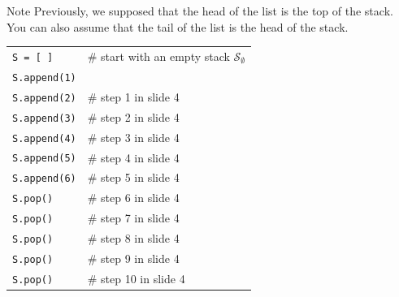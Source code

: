 \documentclass[t,handout,9pt]{beamer}
\begin{document}
\begin{frame}
\vfill
\begin{block}{Note}
Previously, we supposed that the head of the list is the top of the stack.\\
You can also assume that the tail of the list is the head of the stack.
\end{block}
\vfill
\begin{table}[]
\begin{flushleft}
\begin{tabular}{ll}
\texttt{S = [ ]} &  \# start with an empty stack $\mathcal{S}_\emptyset$\\
\texttt{S.append(1)} &  \\
\texttt{S.append(2)} &  \# step 1 in slide 4\\
\texttt{S.append(3)} &  \# step 2 in slide 4\\
\texttt{S.append(4)} &  \# step 3 in slide 4\\
\texttt{S.append(5)} &  \# step 4 in slide 4\\
\texttt{S.append(6)} &  \# step 5 in slide 4\\
\texttt{S.pop()} &  \# step 6 in slide 4\\
\texttt{S.pop()} &  \# step 7 in slide 4\\
\texttt{S.pop()} &  \# step 8 in slide 4\\
\texttt{S.pop()} &  \# step 9 in slide 4\\
\texttt{S.pop()} &  \# step 10 in slide 4\\
\end{tabular}
\end{flushleft}
\end{table}
\vfill
\end{frame}
\end{document}
